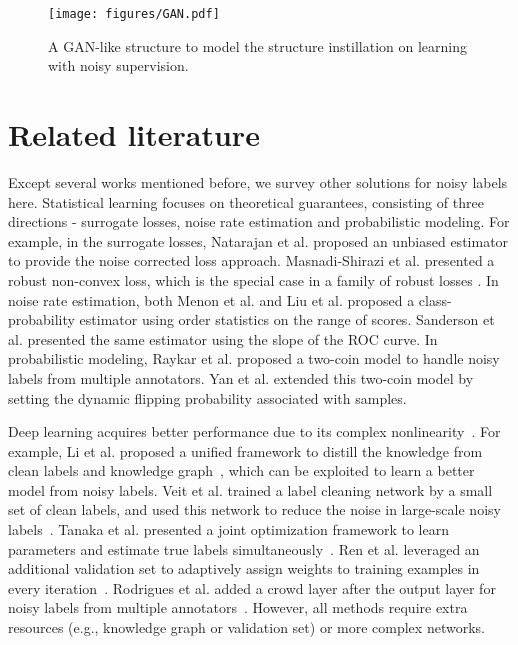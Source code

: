 \documentclass{article}
\begin{document}
\begin{figure}[!t]
\centering
\texttt{[image: figures/GAN.pdf]}
\caption{A GAN-like structure to model the structure instillation on learning with noisy supervision.}
\label{fig:GAN}
\end{figure}

\section{Related literature}
Except several works mentioned before, we survey other solutions for noisy labels here.
Statistical learning focuses on theoretical guarantees, consisting of three directions - surrogate losses, noise rate estimation and probabilistic modeling. For example,
in the surrogate losses, Natarajan et al. \cite{natarajan2013learning} proposed an unbiased estimator to provide the noise corrected loss approach. Masnadi-Shirazi et al. \cite{masnadi2009design} presented a robust non-convex loss, which is the special case in a family of robust losses \cite{han2016convergence}. In noise rate estimation, both Menon et al. \cite{menon2015learning} and Liu et al. \cite{liu2016classification} proposed a class-probability estimator using order statistics on the range of scores. Sanderson et al. \cite{sanderson2014class} presented the same estimator using the slope of the ROC curve. In probabilistic modeling, Raykar et al. \cite{raykar2010learning} proposed a two-coin model to handle noisy labels from multiple annotators. Yan et al. \cite{yan2014learning} extended this two-coin model by setting the dynamic flipping probability associated with samples.



Deep learning acquires better performance due to its complex nonlinearity~\cite{jiang2017mentornet,wang2018iterative,hendrycks2018using,zhang2018generalized}. For example, Li et al. proposed a unified framework to distill the knowledge from clean labels and knowledge graph~\cite{li2017learning}, which can be exploited to learn a better model from noisy labels. Veit et al. trained a label cleaning network by a small set of clean labels, and used this network to reduce the noise in large-scale noisy labels~\cite{veit2017learning}. Tanaka et al. presented a joint optimization framework to learn parameters and estimate true labels simultaneously~\cite{tanaka2018joint}. Ren et al. leveraged an additional validation set to adaptively assign weights to training examples in every iteration~\cite{ren2018learning}. Rodrigues et al. added a crowd layer after the output layer for noisy labels from multiple annotators~\cite{rodrigues2017deep}. However, all methods require extra resources (e.g., knowledge graph or validation set) or more complex networks.
\end{document}
